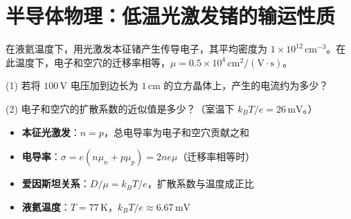 \section{半导体物理：低温光激发锗的输运性质}
\label{sec:photoexcited-ge}

\begin{modelbox}[题目：液氦温度下光激发本征锗的电流与扩散]
在液氦温度下，用光激发本征锗产生传导电子，其平均密度为 $1\times10^{12}\,\text{cm}^{-3}$。在此温度下，电子和空穴的迁移率相等，$\mu=0.5\times10^4\,\text{cm}^2/(\text{V}\cdot\text{s})$。

(1) 若将 $100\,\text{V}$ 电压加到边长为 $1\,\text{cm}$ 的立方晶体上，产生的电流约为多少？

(2) 电子和空穴的扩散系数的近似值是多少？（室温下 $k_BT/e=26\,\text{mV}$。）
\end{modelbox}

\begin{tipbox}[考点快速分析]
\begin{itemize}
    \item \textbf{本征光激发}：$n=p$，总电导率为电子和空穴贡献之和
    \item \textbf{电导率}：$\sigma=e(n\mu_n+p\mu_p)=2ne\mu$（迁移率相等时）
    \item \textbf{爱因斯坦关系}：$D/\mu=k_BT/e$，扩散系数与温度成正比
    \item \textbf{液氦温度}：$T=77\,\text{K}$，$k_BT/e\approx6.67\,\text{mV}$
\end{itemize}
\end{tipbox}

